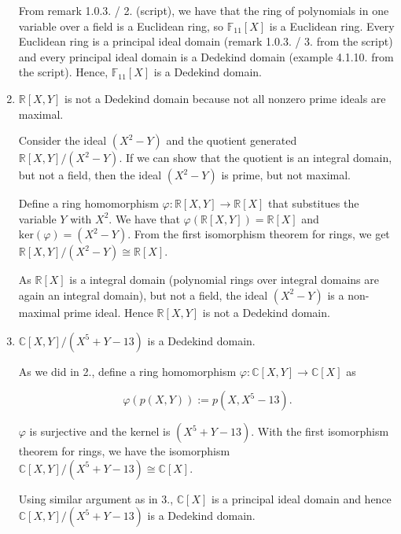 \documentclass[a4paper]{article}
\theoremstyle{definition}
\begin{document}
\begin{enumerate}
    From remark 1.0.3. / 2. (script), we have that the ring of polynomials in one variable over a field is a Euclidean ring, so \(\mathbb{F}_{11}[X]\) is a Euclidean ring. Every Euclidean ring is a principal ideal domain (remark 1.0.3. / 3. from the script) and every principal ideal domain is a Dedekind domain (example 4.1.10. from the script). Hence, \(\mathbb{F}_{11}[X]\) is a Dedekind domain.
    \item \(\mathbb{R}[X, Y]\) is not a Dedekind domain because not all nonzero prime ideals are maximal.

    Consider the ideal \((X^2 - Y)\) and the quotient generated \(\mathbb{R}[X, Y] / (X^2 - Y)\). If we can show that the quotient is an integral domain, but not a field, then the ideal \((X^2 - Y)\) is prime, but not maximal.

    Define a ring homomorphism \(\varphi: \mathbb{R}[X, Y] \rightarrow \mathbb{R}[X]\) that substitues the variable \(Y\) with \(X^2\). We have that \(\varphi(\mathbb{R}[X, Y]) = \mathbb{R}[X]\) and \(\text{ker}(\varphi) = (X^2 - Y)\). From the first isomorphism theorem for rings, we get \(\mathbb{R}[X, Y] / (X^2 - Y) \cong \mathbb{R}[X]\).

    As \(\mathbb{R}[X]\) is a integral domain (polynomial rings over integral domains are again an integral domain), but not a field, the ideal \((X^2 - Y)\) is a non-maximal prime ideal. Hence \(\mathbb{R}[X, Y]\) is not a Dedekind domain.
    \item \(\mathbb{C}[X, Y] / (X^5 + Y - 13)\) is a Dedekind domain.
    
    As we did in 2., define a ring homomorphism \(\varphi: \mathbb{C}[X, Y] \rightarrow \mathbb{C}[X]\) as

    \begin{equation}
        \varphi(p(X, Y)) := p(X, X^5 - 13) \text{.} 
    \end{equation}

    \(\varphi\) is surjective and the kernel is \((X^5 + Y - 13)\). With the first isomorphism theorem for rings, we have the isomorphism \(\mathbb{C}[X, Y] / (X^5 + Y - 13) \cong \mathbb{C}[X]\).

    Using similar argument as in 3., \(\mathbb{C}[X]\) is a principal ideal domain and hence \(\mathbb{C}[X, Y] / (X^5 + Y - 13)\) is a Dedekind domain.
\end{enumerate}
\end{document}
